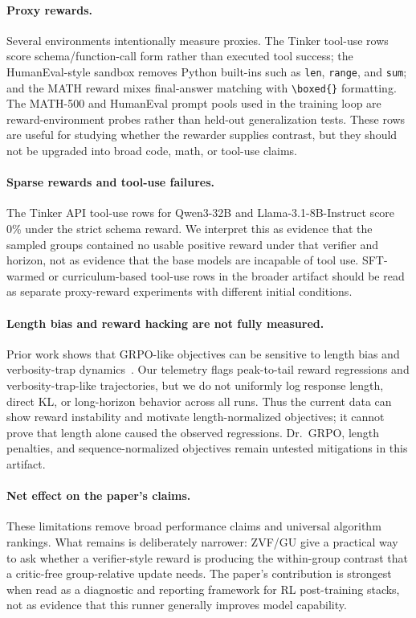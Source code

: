 \documentclass{article}
\begin{document}
\paragraph{Proxy rewards.}
Several environments intentionally measure proxies.  The Tinker tool-use rows
score schema/function-call form rather than executed tool success; the
HumanEval-style sandbox removes Python built-ins such as \texttt{len},
\texttt{range}, and \texttt{sum}; and the MATH reward mixes final-answer matching
with \texttt{\textbackslash boxed\{\}} formatting.  The MATH-500 and HumanEval
prompt pools used in the training loop are reward-environment probes rather
than held-out generalization tests.  These rows are useful for studying whether
the rewarder supplies contrast, but they should not be upgraded into broad code,
math, or tool-use claims.

\paragraph{Sparse rewards and tool-use failures.}
The Tinker API tool-use rows for Qwen3-32B and Llama-3.1-8B-Instruct score 0\%
under the strict schema reward.  We interpret this as evidence that the sampled
groups contained no usable positive reward under that verifier and horizon, not
as evidence that the base models are incapable of tool use.  SFT-warmed or
curriculum-based tool-use rows in the broader artifact should be read as
separate proxy-reward experiments with different initial conditions.

\paragraph{Length bias and reward hacking are not fully measured.}
Prior work shows that GRPO-like objectives can be sensitive to length bias and
verbosity-trap dynamics~\citep{liu2025drgrpo,wang2025madgrpo}.  Our telemetry
flags peak-to-tail reward regressions and verbosity-trap-like trajectories, but
we do not uniformly log response length, direct KL, or long-horizon behavior
across all runs.  Thus the current data can show reward instability and motivate
length-normalized objectives; it cannot prove that length alone caused the
observed regressions.  Dr.~GRPO, length penalties, and sequence-normalized
objectives remain untested mitigations in this artifact.

\paragraph{Net effect on the paper's claims.}
These limitations remove broad performance claims and universal algorithm
rankings.  What remains is deliberately narrower: ZVF/GU give a practical way to
ask whether a verifier-style reward is producing the within-group contrast that
a critic-free group-relative update needs.  The paper's contribution is strongest
when read as a diagnostic and reporting framework for RL post-training
stacks, not as evidence that this runner generally improves model capability.
\end{document}
